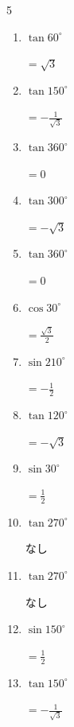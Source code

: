 \begin{multicols}{5}
\begin{enumerate}
  \item $\displaystyle \tan{60^\circ}$

        $\displaystyle =\sqrt{3}$

\columnbreak %

  \item $\displaystyle \tan{150^\circ}$

        $\displaystyle =-\frac{1}{\sqrt{3}}$

  \item $\displaystyle \tan{360^\circ}$

        $\displaystyle =0$

  \item $\displaystyle \tan{300^\circ}$

        $\displaystyle =-\sqrt{3}$

  \item $\displaystyle \tan{360^\circ}$

        $\displaystyle =0$

  \item $\displaystyle \cos{30^\circ}$

        $\displaystyle =\frac{\sqrt{3}}{2}$

  \item $\displaystyle \sin{210^\circ}$

        $\displaystyle =-\frac{1}{2}$

  \item $\displaystyle \tan{120^\circ}$

        $\displaystyle =-\sqrt{3}$

  \item $\displaystyle \sin{30^\circ}$

        $\displaystyle =\frac{1}{2}$

  \item $\displaystyle \tan{270^\circ}$

        $\displaystyle なし$

  \item $\displaystyle \tan{270^\circ}$

        $\displaystyle なし$

  \item $\displaystyle \sin{150^\circ}$

        $\displaystyle =\frac{1}{2}$

  \item $\displaystyle \tan{150^\circ}$

        $\displaystyle =-\frac{1}{\sqrt{3}}$


\end{enumerate}
\end{multicols}
